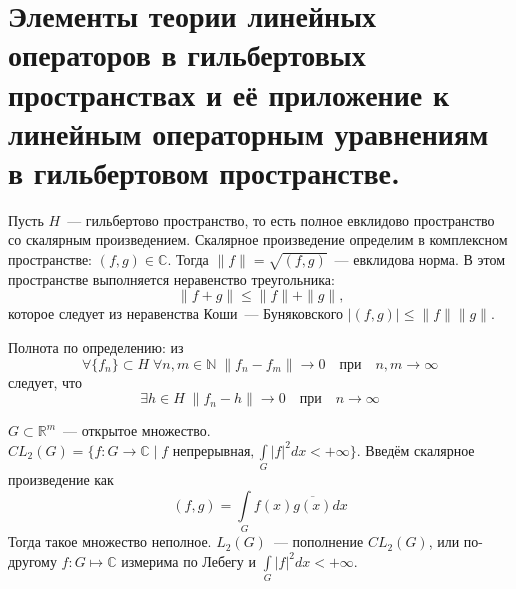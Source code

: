 \documentclass[14pt]{extarticle}
\begin{document}
\section*{Элементы теории линейных операторов в гильбертовых пространствах и её приложение к линейным операторным уравнениям в гильбертовом пространстве.}
Пусть $H$~--- гильбертово пространство, то есть полное евклидово пространство со скалярным произведением.
Скалярное произведение определим в комплексном пространстве: $(f,g) \in \mathbb C$.
Тогда $\|f\| = \sqrt{(f,g)}$~--- евклидова норма.
В этом пространстве выполняется неравенство треугольника:
$$
\|f + g\| \le \|f\| + \|g\|\text{,}
$$
которое следует из неравенства Коши~--- Буняковского $|(f,g)| \le \|f\|\|g\|$.

Полнота по определению: из
$$
\forall \{f_n\} \subset H\; \forall n,m \in \mathbb N\; \|f_n - f_m\| \to 0 \quad \text{при} \quad n,m \to \infty
$$
следует, что 
$$
\exists h \in H\; \|f_n - h\| \to 0\quad \text{при} \quad n \to \infty
$$

$G \subset \mathbb R^m$~--- открытое множество.
$CL_2(G) = \{f\colon G \to \mathbb C \mid f\text{ непрерывная}, \int\limits_G |f|^2 dx < +\infty\}$.
Введём скалярное произведение как
$$
(f, g) = \int\limits_G f(x) \overline{g(x)} dx
$$
Тогда такое множество неполное.
$L_2(G)$~--- пополнение $CL_2(G)$, или по-другому $f:G \mapsto \mathbb C$ измерима по Лебегу и $\int\limits_G |f|^2 dx < +\infty$.
\end{document}
